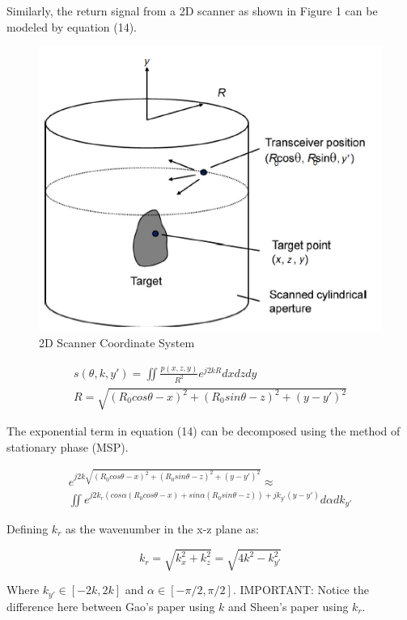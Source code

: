 \documentclass{IEEEtran}
\begin{document}
Similarly, the return signal from a 2D scanner as shown in Figure 1 can be modeled by equation (14).

\begin{figure}[h]
	\centering
	\includegraphics[scale = 0.5]{D Sheen Cylindrical Coordinate System.png}
	\centering
	\caption{2D Scanner Coordinate System}
	\label{fig:coordSys2D}
\end{figure}

\begin{gather}
s(\theta,k,y') = \iint \frac{p(x,z,y)}{R^2}e^{j2kR}dxdzdy \\
R = \sqrt{(R_0 cos\theta - x)^2 + (R_0 sin\theta - z)^2 + (y - y')^2}
\end{gather}

The exponential term in equation (14) can be decomposed using the method of stationary phase (MSP).

\begin{multline}
e^{j2k\sqrt{(R_0 cos\theta - x)^2 + (R_0 sin\theta - z)^2 + (y - y')^2}} \approx \\ \iint e^{j2k_r(cos\alpha(R_0cos\theta-x)+sin\alpha(R_0sin\theta - z)) + jk_{y'}(y - y')} d\alpha dk_{y'}
\end{multline}

Defining $k_r$ as the wavenumber in the x-z plane as:

\begin{equation}
k_r = \sqrt{k_x^2 + k_z^2} = \sqrt{4k^2 - k_{y'}^2}
\end{equation}

Where $k_{y'} \in [-2k,2k]$ and $\alpha \in [-\pi/2,\pi/2]$. IMPORTANT: Notice the difference here between Gao's paper using $k$ and Sheen's paper using $k_r$.
\end{document}
